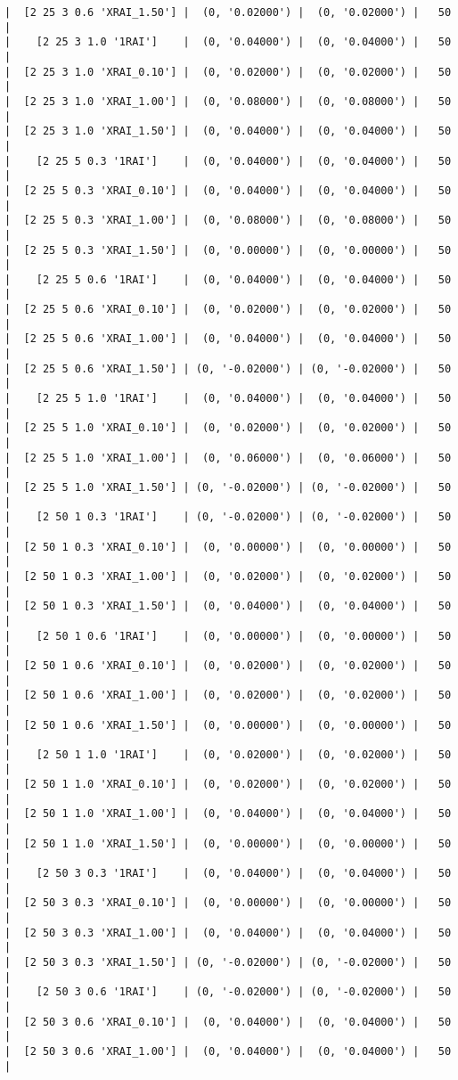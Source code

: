 \documentclass{article}
\begin{document}
\begin{verbatim}
|  [2 25 3 0.6 'XRAI_1.50'] |  (0, '0.02000') |  (0, '0.02000') |   50  |
|    [2 25 3 1.0 '1RAI']    |  (0, '0.04000') |  (0, '0.04000') |   50  |
|  [2 25 3 1.0 'XRAI_0.10'] |  (0, '0.02000') |  (0, '0.02000') |   50  |
|  [2 25 3 1.0 'XRAI_1.00'] |  (0, '0.08000') |  (0, '0.08000') |   50  |
|  [2 25 3 1.0 'XRAI_1.50'] |  (0, '0.04000') |  (0, '0.04000') |   50  |
|    [2 25 5 0.3 '1RAI']    |  (0, '0.04000') |  (0, '0.04000') |   50  |
|  [2 25 5 0.3 'XRAI_0.10'] |  (0, '0.04000') |  (0, '0.04000') |   50  |
|  [2 25 5 0.3 'XRAI_1.00'] |  (0, '0.08000') |  (0, '0.08000') |   50  |
|  [2 25 5 0.3 'XRAI_1.50'] |  (0, '0.00000') |  (0, '0.00000') |   50  |
|    [2 25 5 0.6 '1RAI']    |  (0, '0.04000') |  (0, '0.04000') |   50  |
|  [2 25 5 0.6 'XRAI_0.10'] |  (0, '0.02000') |  (0, '0.02000') |   50  |
|  [2 25 5 0.6 'XRAI_1.00'] |  (0, '0.04000') |  (0, '0.04000') |   50  |
|  [2 25 5 0.6 'XRAI_1.50'] | (0, '-0.02000') | (0, '-0.02000') |   50  |
|    [2 25 5 1.0 '1RAI']    |  (0, '0.04000') |  (0, '0.04000') |   50  |
|  [2 25 5 1.0 'XRAI_0.10'] |  (0, '0.02000') |  (0, '0.02000') |   50  |
|  [2 25 5 1.0 'XRAI_1.00'] |  (0, '0.06000') |  (0, '0.06000') |   50  |
|  [2 25 5 1.0 'XRAI_1.50'] | (0, '-0.02000') | (0, '-0.02000') |   50  |
|    [2 50 1 0.3 '1RAI']    | (0, '-0.02000') | (0, '-0.02000') |   50  |
|  [2 50 1 0.3 'XRAI_0.10'] |  (0, '0.00000') |  (0, '0.00000') |   50  |
|  [2 50 1 0.3 'XRAI_1.00'] |  (0, '0.02000') |  (0, '0.02000') |   50  |
|  [2 50 1 0.3 'XRAI_1.50'] |  (0, '0.04000') |  (0, '0.04000') |   50  |
|    [2 50 1 0.6 '1RAI']    |  (0, '0.00000') |  (0, '0.00000') |   50  |
|  [2 50 1 0.6 'XRAI_0.10'] |  (0, '0.02000') |  (0, '0.02000') |   50  |
|  [2 50 1 0.6 'XRAI_1.00'] |  (0, '0.02000') |  (0, '0.02000') |   50  |
|  [2 50 1 0.6 'XRAI_1.50'] |  (0, '0.00000') |  (0, '0.00000') |   50  |
|    [2 50 1 1.0 '1RAI']    |  (0, '0.02000') |  (0, '0.02000') |   50  |
|  [2 50 1 1.0 'XRAI_0.10'] |  (0, '0.02000') |  (0, '0.02000') |   50  |
|  [2 50 1 1.0 'XRAI_1.00'] |  (0, '0.04000') |  (0, '0.04000') |   50  |
|  [2 50 1 1.0 'XRAI_1.50'] |  (0, '0.00000') |  (0, '0.00000') |   50  |
|    [2 50 3 0.3 '1RAI']    |  (0, '0.04000') |  (0, '0.04000') |   50  |
|  [2 50 3 0.3 'XRAI_0.10'] |  (0, '0.00000') |  (0, '0.00000') |   50  |
|  [2 50 3 0.3 'XRAI_1.00'] |  (0, '0.04000') |  (0, '0.04000') |   50  |
|  [2 50 3 0.3 'XRAI_1.50'] | (0, '-0.02000') | (0, '-0.02000') |   50  |
|    [2 50 3 0.6 '1RAI']    | (0, '-0.02000') | (0, '-0.02000') |   50  |
|  [2 50 3 0.6 'XRAI_0.10'] |  (0, '0.04000') |  (0, '0.04000') |   50  |
|  [2 50 3 0.6 'XRAI_1.00'] |  (0, '0.04000') |  (0, '0.04000') |   50  |

\end{verbatim}
\end{document}
